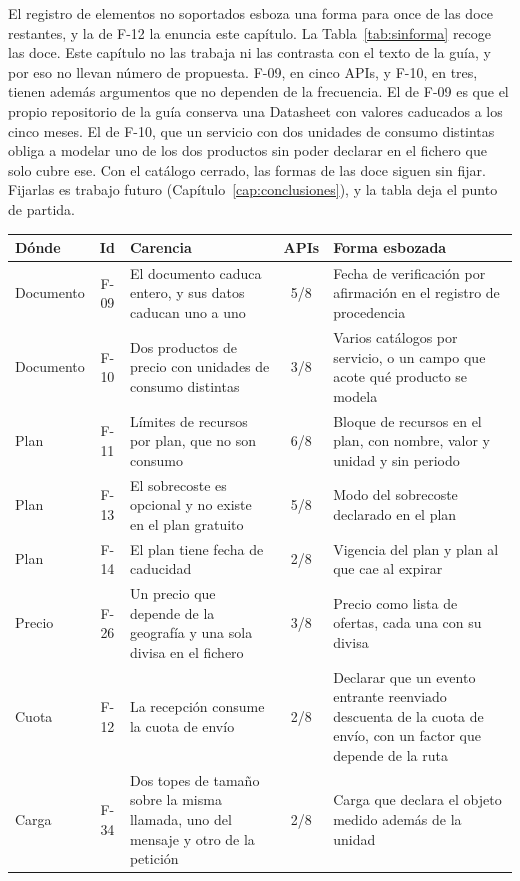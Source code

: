 El registro de elementos no soportados esboza una forma para once de las doce restantes, y la de F-12 la enuncia este capítulo.
La Tabla~\ref{tab:sinforma} recoge las doce.
Este capítulo no las trabaja ni las contrasta con el texto de la guía, y por eso no llevan número de propuesta.
F-09, en cinco APIs, y F-10, en tres, tienen además argumentos que no dependen de la frecuencia.
El de F-09 es que el propio repositorio de la guía conserva una Datasheet con valores caducados a los cinco meses.
El de F-10, que un servicio con dos unidades de consumo distintas obliga a modelar uno de los dos productos sin poder declarar en el fichero que solo cubre ese.
Con el catálogo cerrado, las formas de las doce siguen sin fijar.
Fijarlas es trabajo futuro (Capítulo~\ref{cap:conclusiones}), y la tabla deja el punto de partida.

\begin{table}[H]
\centering
\small
\setlength{\tabcolsep}{3pt}
\begin{tabular}{|l|c|p{}|c|p{}|}
\hline
\textbf{Dónde} & \textbf{Id} & \textbf{Carencia} & \textbf{APIs} & \textbf{Forma esbozada} \\
\hline
Documento & F-09 & El documento caduca entero, y sus datos caducan uno a uno & 5/8 & Fecha de verificación por afirmación en el registro de procedencia \\
\hline
Documento & F-10 & Dos productos de precio con unidades de consumo distintas & 3/8 & Varios catálogos por servicio, o un campo que acote qué producto se modela \\
\hline
Plan & F-11 & Límites de recursos por plan, que no son consumo & 6/8 & Bloque de recursos en el plan, con nombre, valor y unidad y sin periodo \\
\hline
Plan & F-13 & El sobrecoste es opcional y no existe en el plan gratuito & 5/8 & Modo del sobrecoste declarado en el plan \\
\hline
Plan & F-14 & El plan tiene fecha de caducidad & 2/8 & Vigencia del plan y plan al que cae al expirar \\
\hline
Precio & F-26 & Un precio que depende de la geografía y una sola divisa en el fichero & 3/8 & Precio como lista de ofertas, cada una con su divisa \\
\hline
Cuota & F-12 & La recepción consume la cuota de envío & 2/8 & Declarar que un evento entrante reenviado descuenta de la cuota de envío, con un factor que depende de la ruta \\
\hline
Carga & F-34 & Dos topes de tamaño sobre la misma llamada, uno del mensaje y otro de la petición & 2/8 & Carga que declara el objeto medido además de la unidad \\

\end{tabular}
\end{table}
